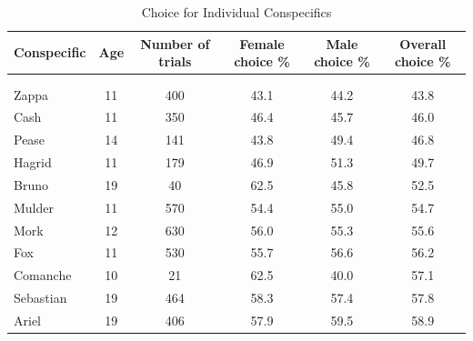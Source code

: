 \documentclass[
  ,pub,floatsintext]{apa6}
\begin{document}
\begin{table}[!h]

\caption{\label{tab:preferencetablelatex}Choice for Individual Conspecifics}
\centering
\begin{tabular}[t]{lccccc}
\toprule
Conspecific & Age & Number of trials & Female choice \% & Male choice \% & Overall choice \%\\
\midrule
\addlinespace[0.3em]
\multicolumn{6}{l}{\textbf{Replicate 1}}\\
\addlinespace[0.3em]
\multicolumn{6}{l}{\textit{Males}}\\
\hspace{1em}\hspace{1em}Zappa & 11 & 400 & 43.1 & 44.2 & 43.8\\
\hspace{1em}\hspace{1em}Cash & 11 & 350 & 46.4 & 45.7 & 46.0\\
\hspace{1em}\hspace{1em}Pease & 14 & 141 & 43.8 & 49.4 & 46.8\\
\hspace{1em}\hspace{1em}Hagrid & 11 & 179 & 46.9 & 51.3 & 49.7\\
\hspace{1em}\hspace{1em}Bruno & 19 & 40 & 62.5 & 45.8 & 52.5\\
\hspace{1em}\hspace{1em}Mulder & 11 & 570 & 54.4 & 55.0 & 54.7\\
\hspace{1em}\hspace{1em}Mork & 12 & 630 & 56.0 & 55.3 & 55.6\\
\hspace{1em}\hspace{1em}Fox & 11 & 530 & 55.7 & 56.6 & 56.2\\
\hspace{1em}\hspace{1em}Comanche & 10 & 21 & 62.5 & 40.0 & 57.1\\
\hspace{1em}\hspace{1em}Sebastian & 19 & 464 & 58.3 & 57.4 & 57.8\\
\hspace{1em}\hspace{1em}Ariel & 19 & 406 & 57.9 & 59.5 & 58.9\\

\end{tabular}
\end{table}
\end{document}

